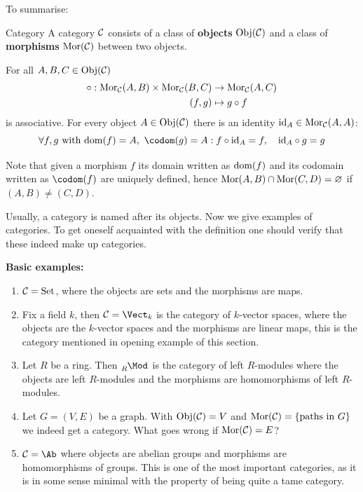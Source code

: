 \documentclass[twoside = false,	%
		headsepline,		%
		parskip = true,
		]{scrbook}						%
\begin{document}
    To summarise:

    \begin{definition*}{Category}
        A category $\mathcal C$ consists of a class of \textbf{objects} $\mathrm{Obj}(\mathcal C)$ and
        a class of \textbf{morphisms} $\mathrm{Mor}(\mathcal C)$ between two objects.
        
        For all $A,B,C \in \mathrm{Obj}(\mathcal C)$
        \begin{equation*}
            \begin{split}
               \circ: \mathrm{Mor}_{\mathcal C}(A,B) \times \mathrm{Mor}_{\mathcal C}(B,C) &\rightarrow \mathrm{Mor}_{\mathcal C}(A,C) \\
                (f,g) &\mapsto g \circ f
            \end{split}
        \end{equation*}
        is associative. For every object $A \in \mathrm{Obj}(\mathcal C)$ there is an identity $\mathrm{id}_A \in \mathrm{Mor}_{\mathcal C}(A,A)$:
        \begin{equation*}
           \forall f,g \text{ with } \dom(f) = A, \ \codom(g) = A:  f \circ \id_A = f, \quad \id_A \circ g = g
        \end{equation*}
    \end{definition*}

    Note that given a morphism $f$ its domain written as $\mathrm{dom}(f)$ and
    its codomain written as $\codom(f)$ are uniquely defined,
    hence $\mathrm{Mor}(A,B) \cap \mathrm{Mor}(C,D) = \varnothing$ if $(A,B) \neq (C,D)$.

    Usually, a category is named after its objects. Now we give examples of categories.
    To get oneself acquainted with the definition one should verify that these indeed make up categories.
    
    \textbf{Basic examples:}
        \begin{enumerate}
            \item
                $\mathcal C = \mathrm{Set}$, where the objects are sets and the morphisms are maps.
            \item
                Fix a field $k$, then $\cC = \Vect_k$ is the category of $k$-vector spaces, where the objects are the $k$-vector spaces and the morphisms are linear maps, this is the category mentioned in opening example of this section.
            \item
                Let $R$ be a ring. Then $\tensor[_R]{\Mod}{^{}}$ is the category of left $R$-modules where the objects are left $R$-modules and the morphisms are homomorphisms of left $R$-modules.
            \item
                Let $G = (V,E)$ be a graph. With $\mathrm{Obj}(\mathcal C) = V$ and $\mathrm{Mor} (\mathcal C) = \{\text{paths in } G\}$ we indeed get a category. What goes wrong if $\mathrm{Mor}(\mathcal C) = E$?
            \item
                $\cC = \Ab$ where objects are abelian groups and morphisms are homomorphisms of groups. This is one of the most important categories, as it is in some sense minimal with the property of being quite a tame category.
        \end{enumerate}
\end{document}
